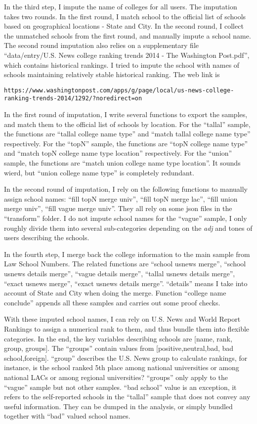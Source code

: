 \documentclass[12pt]{article}
\begin{document}
In the third step, I impute the name of colleges for all users. The imputation takes two rounds. In the first round, I match school to the official list of schools based on geographical locations - State and City. In the second round, I collect the unmatched schools from the first round, and manually impute a school name. The second round imputation also relies on a supplementary file ``data/entry/U.S. News college ranking trends 2014 - The Washington Post.pdf'', which contains historical rankings. I tried to impute the school with names of schools maintaining relatively stable historical ranking. The web link is 
\small
\begin{verbatim}
https://www.washingtonpost.com/apps/g/page/local/us-news-college-ranking-trends-2014/1292/?noredirect=on
\end{verbatim}
\normalsize

In the first round of imputation, I write several functions to export the samples, and match them to the official list of schools by location. For the ``tallal'' sample, the functions are ``tallal college name type'' and ``match tallal college name type'' respectively. For the ``topN'' sample, the functions are ``topN college name type'' and ``match topN college name type location'' respectively. For the ``union'' sample, the functions are ``match union college name type location''. It sounds wierd, but ``union college name type'' is completely redundant. 

In the second round of imputation, I rely on the following functions to manually assign school names: ``fill topN merge univ'', ``fill topN merge lac'', ``fill union merge univ'', ``fill vague merge univ''. They all rely on some json files in the ``transform'' folder. I do not impute school names for the ``vague'' sample, I only roughly divide them into several sub-categories depending on the {\itshape adj} and tones of users describing the schools.

In the fourth step, I merge back the college information to the main sample from Law School Numbers. The related functions are ``school usnews merge'', ``school usnews details merge'', ``vague details merge'', ``tallal usnews details merge'', ``exact usnews merge'', ``exact usnews details merge''. ``details'' means I take into account of State and City when doing the merge. Function ``college name conclude'' appends all these samples and carries out some proof checks.

With these imputed school names, I can rely on U.S. News and World Report Rankings to assign a numerical rank to them, and thus bundle them into flexible categories. In the end, the key variables describing schools are [name, rank, group, groups]. The ``groups'' contain values from [positive,neutral,bad, bad school,foreign]. ``group'' describes the U.S. News group to calculate rankings, for instance, is the school ranked 5th place among national universities or among national LACs or among regional universities? ``groups'' only apply to the ``vague'' sample but not other samples. ``bad school'' value is an exception, it refers to the self-reported schools in the ``tallal'' sample that does not convey any useful information. They can be dumped in the analysis, or simply bundled together with ``bad'' valued school names.
\end{document}
